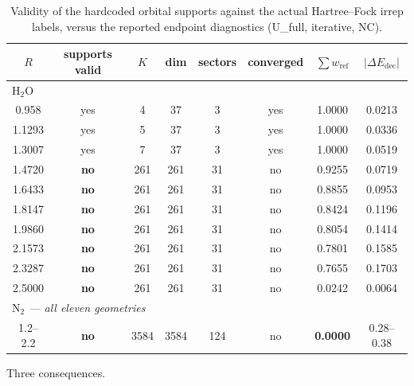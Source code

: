 \begin{table}[htbp]
\centering
\caption{Validity of the hardcoded orbital supports against the actual
Hartree--Fock irrep labels, versus the reported endpoint diagnostics
(U\_full, iterative, NC).}
\label{tab:support-vs-k}
\begin{tabular}{cccccccc}
\toprule
$R$ & supports valid & $K$ & dim & sectors & converged &
$\sum w_{\mathrm{ref}}$ & $|\Delta E_{\mathrm{dec}}|$ \\
\midrule
\multicolumn{8}{l}{\emph{$\mathrm{H_2O}$}}\\
0.958  & yes & 4   & 37  & 3  & yes & 1.0000 & 0.0213 \\
1.1293 & yes & 5   & 37  & 3  & yes & 1.0000 & 0.0336 \\
1.3007 & yes & 7   & 37  & 3  & yes & 1.0000 & 0.0519 \\
1.4720 & \textbf{no}  & 261 & 261 & 31 & no & 0.9255 & 0.0719 \\
1.6433 & \textbf{no}  & 261 & 261 & 31 & no & 0.8855 & 0.0953 \\
1.8147 & \textbf{no}  & 261 & 261 & 31 & no & 0.8424 & 0.1196 \\
1.9860 & \textbf{no}  & 261 & 261 & 31 & no & 0.8054 & 0.1414 \\
2.1573 & \textbf{no}  & 261 & 261 & 31 & no & 0.7801 & 0.1585 \\
2.3287 & \textbf{no}  & 261 & 261 & 31 & no & 0.7655 & 0.1703 \\
2.5000 & \textbf{no}  & 261 & 261 & 31 & no & 0.0242 & 0.0064 \\
\midrule
\multicolumn{8}{l}{\emph{$\mathrm{N_2}$ --- all eleven geometries}}\\
1.2--2.2 & \textbf{no} & 3584 & 3584 & 124 & no & \textbf{0.0000} & 0.28--0.38 \\
\bottomrule
\end{tabular}
\end{table}

Three consequences.

